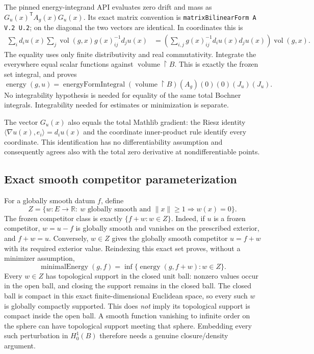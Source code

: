 \documentclass[11pt]{article}
\theoremstyle{definition}
\theoremstyle{remark}
\numberwithin{equation}{section}
\begin{document}
The pinned energy-integrand API evaluates zero drift and mass as
$G_u(x)^\mathsf{T} A_g(x)G_u(x)$. Its exact matrix convention is
\texttt{matrixBilinearForm A V.2 U.2}; on the diagonal the two vectors
are identical. In coordinates this is
\begin{align*}
 \sum_i d_i u(x)\sum_j\operatorname{vol}(g,x)g(x)^{-1}_{ij}d_j u(x)
 &=\left(\sum_{i,j}g(x)^{-1}_{ij}d_i u(x)d_j u(x)\right)
 \operatorname{vol}(g,x).
\end{align*}
The equality uses only finite distributivity and real commutativity. Integrate
the everywhere equal scalar functions against
$\operatorname{volume}\!\restriction B$. This is exactly the frozen set
integral, and proves
\[
 \operatorname{energy}(g,u)
 =\operatorname{energyFormIntegral}
   (\operatorname{volume}\!\restriction B)
   (A_g)(0)(0)(J_u)(J_u).
\]
No integrability hypothesis is needed for equality of the same total Bochner
integrals. Integrability needed for estimates or minimization is separate.

The vector $G_u(x)$ also equals the total Mathlib gradient: the Riesz identity
$\langle\nabla u(x),e_i\rangle=d_i u(x)$ and the coordinate inner-product rule
identify every coordinate. This identification has no differentiability
assumption and consequently agrees also with the total zero derivative at
nondifferentiable points.

\subsection{Exact smooth competitor parameterization}\label{energy-bridge:competitors}
For a globally smooth datum $f$, define
\[
 Z=\{w:E\to\mathbb R:\ w\text{ globally smooth and }
    \|x\|\geq1\Rightarrow w(x)=0\}.
\]
The frozen competitor class is exactly $\{f+w:w\in Z\}$.
Indeed, if $u$ is a frozen competitor, $w=u-f$ is globally smooth and
vanishes on the prescribed exterior, and $f+w=u$. Conversely, $w\in Z$
gives the globally smooth competitor $u=f+w$ with its required exterior value.
Reindexing this exact set proves, without a minimizer assumption,
\[
 \operatorname{minimalEnergy}(g,f)
 =\inf\{\operatorname{energy}(g,f+w):w\in Z\}.
\]
Every $w\in Z$ has topological support in the closed unit ball: nonzero
values occur in the open ball, and closing the support remains in the closed
ball. The closed ball is compact in this exact finite-dimensional Euclidean
space, so every such $w$ is globally compactly supported.
This does \emph{not} imply its topological support is compact inside the open
ball. A smooth function vanishing to infinite order on the sphere can have
topological support meeting that sphere. Embedding every such perturbation
in $H^1_0(B)$ therefore needs a genuine closure/density argument.
\end{document}
